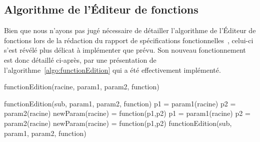 \subsection{Algorithme de l'Éditeur de fonctions}
\label{ssec:editeurFct}


Bien que nous n'ayons pas jugé nécessaire de détailler l'algorithme de l'Éditeur de fonctions lors de la rédaction du rapport de spécifications fonctionnelles~\cite{spec_fonc}, celui-ci s'est révélé plus délicat à implémenter que prévu. Son nouveau fonctionnement est donc détaillé ci-après, par une présentation de l'{\sc algorithme}~\ref{algo:functionEdition} qui a été effectivement implémenté.


	\begin{algorithm}[H]
            \caption{functionEdition(racine, param1, param2, function)}
            \label{algo:functionEdition}
            \begin{algorithmic}
				\STATE functionEdition(sub, param1, param2, function)
			\ENDFOR
			\RETURN
		\ENDIF
		\STATE
			\STATE p1 = param1(racine)
			\STATE p2 = param2(racine)
			\STATE newParam(racine) = function(p1,p2)
			\RETURN
		\ELSE
					\STATE p1 = param1(racine)
					\STATE p2 = param2(racine)
					\STATE newParam(racine) = function(p1,p2)
				\ENDIF
				\STATE functionEdition(sub, param1, param2, function)
			\ENDFOR
		\ENDIF
            \end{algorithmic}
        \end{algorithm}

